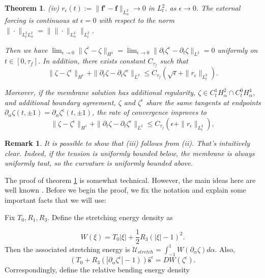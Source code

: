 \documentclass{article}[12pt]
\theoremstyle{Theorem}
\newtheorem{theorem}{Theorem}
\newtheorem{remark}{Remark}
\begin{document}
\begin{theorem}
    (iv) $r_\epsilon(t) := \|\boldsymbol{f}^\epsilon - \boldsymbol{f}\|_{L^2_\alpha} \rightarrow 0 $ in $L^2_t$. as $\epsilon \rightarrow 0$. The external forcing is continuous at $\epsilon = 0$ with respect to the norm $\|\cdot\|_{L^2_t L^2_\alpha }=\| \|\cdot\|_{L^2_\alpha}\|_{L^2_t}$.
    \newline
    
    Then we have $\lim_{\epsilon \rightarrow0}\|\zeta^\epsilon- \zeta\|_{H^1} = \lim_{\epsilon \rightarrow0}\|\partial_t\zeta^\epsilon- \partial_t\zeta\|_{L^2} = 0$ uniformly on $t\in[0,\tau_f]$. In addition, there exists constant $C_{\tau_f}$ such that
    \begin{equation}
    \|\zeta - \zeta^\epsilon\|_{H^1} + \|\partial_t\zeta - \partial_t\zeta^\epsilon\|_{L^2} \leq C_{\tau_f}(\sqrt{\epsilon} +\|r_\epsilon\|_{L^2_t}).
\end{equation}

Moreover, if the membrane solution has additional regularity, $\zeta \in C^1_tH^2_\alpha \cap C^0_tH^4_\alpha$, and additional boundary agreement, $\zeta$ and $\zeta^\epsilon$ share the same tangents at endpoints $\partial_\alpha \zeta(t,\pm1) = \partial_\alpha \zeta^\epsilon(t,\pm1)$, the rate of convergence improves to
\begin{equation}
    \|\zeta - \zeta^\epsilon\|_{H^1} + \|\partial_t\zeta - \partial_t\zeta^\epsilon\|_{L^2} \leq C_{\tau_f}(\epsilon +\|r_\epsilon\|_{L^2_t}),
\end{equation}
    \label{convergence theorem in L2}
\end{theorem}
\begin{remark}
   It is possible to show that (iii) follows from (ii). That's intuitively clear. Indeed, if the tension is uniformly bounded below, the membrane is always uniformly taut, so the curvature is uniformly bounded above.
\end{remark}
The proof of theorem \ref{convergence theorem in L2} is somewhat technical. However, the main ideas here are well known \cite{kato1966perturbation}. Before we begin the proof, we fix the notation and explain some important facts that we will use:
\newline

Fix $T_0,R_1,R_3$. Define the stretching energy density as 

\begin{equation}
    W(\xi) = T_0|\xi| + \frac{1}{2}R_3(|\xi|-1)^2.
\end{equation}
Then the associated stretching energy is $\mathcal{U}_{stretch} = \int_{-1}^1W(\partial_\alpha\zeta)d\alpha$. Also, \begin{equation}
    (T_0 +R_3(|\partial_\alpha \zeta^\epsilon| -1 ))\hat{\boldsymbol{s}}^\epsilon = DW(\zeta^\epsilon).
\end{equation}Correspondingly, define the relative bending energy density 
\end{document}
